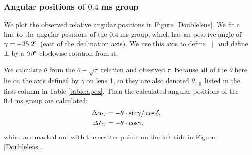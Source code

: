 \documentclass[useAMS,usenatbib]{mn2e}
\begin{document}
\subsubsection{Angular positions of $0.4$ ms group}
We plot the observed relative angular positions in Figure \ref{Doublelens}. We fit a line to the angular positions of the $0.4$ ms group, which has an positive angle of $\gamma=-25.2\degree$ (east of the declination axis). We use this axis to define ${\parallel}$ and define ${\bot}$ by a $90\degree$ clockwise rotation from it. 

We calculate $\theta$ from the $\theta-\sqrt{\tau}$ relation and observed $\tau$. Because all of the $\theta$ here lie on the axis defined by $\gamma$ on lens 1, so they are also denoted $\theta_{1\parallel}$ listed in the first column in Table \ref{table:apex}. Then the calculated angular positions of the $0.4$ ms group are calculated:
\begin{equation}
\begin{aligned}
{\Delta\alpha_C}&=-\theta \cdot {\rm sin}\gamma/\cos{\delta}, \\
{\Delta\delta_C}&=-\theta \cdot {\rm cos}\gamma,
\end{aligned}
\end{equation}
which are marked out with the scatter points on the left side in Figure \ref{Doublelens}.





\end{document}
